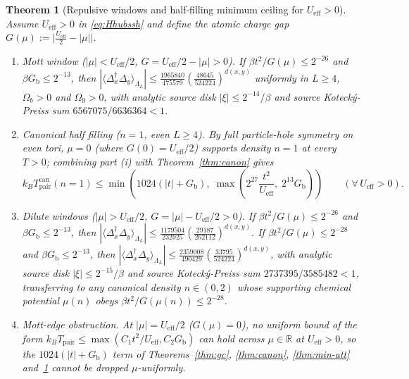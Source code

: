 \documentclass[11pt]{article}
\newtheorem{theorem}{Theorem}[section]
\theoremstyle{definition}
\theoremstyle{remark}
\newcommand{\R}{\mathbb{R}}
\newcommand{\eff}{\mathrm{eff}}
\newcommand{\pair}{\mathrm{pair}}
\newcommand{\Tpair}{T_{\pair}}
\newcommand{\Gb}{G_{\mathrm{b}}}
\newcommand{\Ueff}{U_{\eff}}
\begin{document}
\begin{theorem}[Repulsive windows and half-filling minimum ceiling for $\Ueff>0$]
\label{thm:min-rep}
Assume $\Ueff>0$ in \eqref{eq:Hhubssh} and define the atomic charge gap
$G(\mu):=\bigl|\frac{\Ueff}{2}-|\mu|\bigr|$.
\begin{enumerate}[label=(\roman*),leftmargin=2.2em]
\item \emph{Mott window ($|\mu|<\Ueff/2$, $G=\Ueff/2-|\mu|>0$).} If
$\beta t^2/G(\mu)\le2^{-26}$ and $\beta\Gb\le2^{-13}$, then
$|\langle\Delta_x^\dagger\Delta_y\rangle_{\Lambda_L}|\le
\frac{1965840}{475579}(\frac{48645}{524224})^{d(x,y)}$ uniformly in
$L\ge4$, $\Omega_b>0$ and $\Omega_0>0$, with analytic source disk
$|\xi|\le2^{-14}/\beta$ and source Koteck\'y-Preiss sum $6567075/6636364<1$.
\item \emph{Canonical half filling ($n=1$, even $L\ge4$).} By full particle-hole
symmetry on even tori, $\mu=0$ (where $G(0)=\Ueff/2$) supports density $n=1$ at
every $T>0$; combining part (i) with Theorem~\ref{thm:canon} gives
\begin{equation}
k_B\Tpair^{\mathrm{can}}(n=1)\le\min\!\left(1024(|t|+\Gb),\;
\max\!\left(2^{27}\frac{t^2}{\Ueff},\;2^{13}\Gb\right)\right)
\qquad(\forall\,\Ueff>0).
\label{eq:minrep}
\end{equation}
\item \emph{Dilute windows ($|\mu|>\Ueff/2$, $G=|\mu|-\Ueff/2>0$).} If
$\beta t^2/G(\mu)\le2^{-26}$ and $\beta\Gb\le2^{-13}$, then
$|\langle\Delta_x^\dagger\Delta_y\rangle_{\Lambda_L}|\le
\frac{1179504}{232925}(\frac{29187}{262112})^{d(x,y)}$. If
$\beta t^2/G(\mu)\le2^{-28}$ and $\beta\Gb\le2^{-13}$, then
$|\langle\Delta_x^\dagger\Delta_y\rangle_{\Lambda_L}|\le
\frac{2359008}{490429}(\frac{33795}{524224})^{d(x,y)}$, with analytic source disk
$|\xi|\le2^{-15}/\beta$ and source Koteck\'y-Preiss sum $2737395/3585482<1$,
transferring to any canonical density $n\in(0,2)$ whose supporting chemical
potential $\mu(n)$ obeys $\beta t^2/G(\mu(n))\le2^{-28}$.
\item \emph{Mott-edge obstruction.} At $|\mu|=\Ueff/2$ ($G(\mu)=0$), no uniform
bound of the form $k_B\Tpair\le\max(C_1 t^2/\Ueff,C_2\Gb)$ can hold across $\mu\in\R$
at $\Ueff>0$, so the $1024(|t|+\Gb)$ term of Theorems~\ref{thm:gc}, \ref{thm:canon},
\ref{thm:min-att} and~\ref{thm:min-rep} cannot be dropped $\mu$-uniformly.
\end{enumerate}
\end{theorem}
\end{document}
